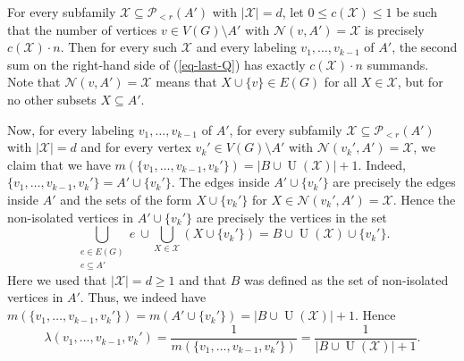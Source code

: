 For every subfamily $\mathcal{X}\subseteq \mathcal{P}\!_{<r}(A')$ with $\vert \mathcal{X}\vert=d$, let $0\leq c(\mathcal{X})\leq 1$ be such that the number of vertices $v\in V(G)\setminus A'$ with $\mathcal{N}(v,A')=\mathcal{X}$ is precisely $c(\mathcal{X})\cdot n$. Then for every such $\mathcal{X}$ and every labeling $v_1,\dots,v_{k-1}$ of $A'$, the second sum on the right-hand side of (\ref{eq-last-Q}) has exactly $c(\mathcal{X})\cdot n$ summands. Note that $\mathcal{N}(v,A')=\mathcal{X}$ means that $X\cup \lbrace v\rbrace\in E(G)$ for all $X\in \mathcal{X}$, but for no other subsets $X\subseteq A'$.

Now, for every labeling $v_1,\dots,v_{k-1}$ of $A'$, for every subfamily $\mathcal{X}\subseteq \mathcal{P}\!_{<r}(A')$ with $\vert \mathcal{X}\vert=d$ and for every vertex $v_k'\in V(G)\setminus A'$ with $\mathcal{N}(v_k',A')=\mathcal{X}$, we claim that we have $m(\lbrace v_1,\dots,v_{k-1}, v_k'\rbrace)=\vert B\cup \operatorname{U}(\mathcal{X})\vert +1$. Indeed, $\lbrace v_1,\dots,v_{k-1}, v_k'\rbrace=A'\cup \lbrace v_k'\rbrace$. The edges inside $A'\cup \lbrace v_k'\rbrace$ are precisely the edges inside $A'$ and the sets of the form $X\cup \lbrace v_k'\rbrace$ for $X\in \mathcal{N}(v_k',A')=\mathcal{X}$. Hence the non-isolated vertices in $A'\cup \lbrace v_k'\rbrace$ are precisely the vertices in the set 
\[\bigcup_{\substack{e\in E(G)\\e\subseteq A'}}e\ \cup \bigcup_{X\in \mathcal{X}}(X\cup \lbrace v_k'\rbrace)=B\cup \operatorname{U}(\mathcal{X})\cup \lbrace v_k'\rbrace.\]
Here we used that $\vert \mathcal{X}\vert=d\geq 1$ and that $B$ was defined as the set of non-isolated vertices in $A'$. Thus, we indeed have $m(\lbrace v_1,\dots,v_{k-1}, v_k'\rbrace)=m(A'\cup \lbrace v_k'\rbrace)=\vert B\cup \operatorname{U}(\mathcal{X})\vert +1$. Hence
\[\lambda(v_1,\dots,v_{k-1}, v_k')=\frac{1}{m(\lbrace v_1,\dots,v_{k-1}, v_k'\rbrace)}=\frac{1}{\vert B\cup \operatorname{U}(\mathcal{X})\vert +1}.\]

